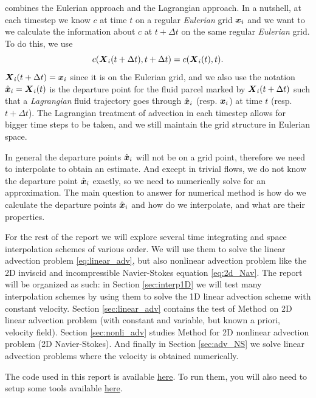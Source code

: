 \documentclass[11pt,letterpaper]{article}
\begin{document}
\sml\;combines the Eulerian approach and the Lagrangian approach. In a nutshell, at each timestep we know $c$ at time $t$ on a regular \textit{Eulerian} grid $\boldsymbol{x}_i$ and we want to we calculate the information about $c$ at $t+\Delta t$ on the same regular \textit{Eulerian} grid. To do this, we use
$$c(\boldsymbol{X}_i(t+\Delta t),t+\Delta t) = c({\boldsymbol{X}}_i(t),t).$$
$\boldsymbol{X}_i(t+\Delta t) = \boldsymbol{x}_i$ since it is on the Eulerian grid, and we also use the notation $\hat{\boldsymbol{x}}_i = {\boldsymbol{X}}_i(t)$ is the departure point for the fluid parcel marked by $\boldsymbol{X}_i(t+\Delta t)$ such that a \textit{Lagrangian} fluid trajectory goes through $\hat{\boldsymbol{x}}_i$ (resp. ${\boldsymbol{x}}_i$) at time $t$ (resp. $t+\Delta t$).
The Lagrangian treatment of advection in each timestep allows for bigger time steps to be taken, and we still maintain the grid structure in Eulerian space. 

In general the departure points $\hat{\boldsymbol{x}}_i$ will not be on a grid point, therefore we need to interpolate to obtain an estimate. And except in trivial flows, we do not know the departure point $\hat{\boldsymbol{x}}_i$ exactly, so we need to numerically solve for an approximation. The main question to answer for \sml\;numerical method is how do we calculate the departure points $\hat{\boldsymbol{x}}_i$ and how do we interpolate, and what are their properties. 

For the rest of the report we will explore several time integrating and space interpolation schemes of various order. We will use them to solve the linear advection problem \eqref{eq:linear_adv}, but also nonlinear advection problem like the 2D inviscid and incompressible Navier-Stokes equation \eqref{eq:2d_Nav}. The report will be organized as such: in Section \ref{sec:interp1D} we will test many interpolation schemes by using them to solve the 1D linear advection scheme with constant velocity. Section \ref{sec:linear_adv} contains the test of \sml\;Method on 2D linear advection problem (with constant and variable, but known a priori, velocity field). Section \ref{sec:nonli_adv} studies \sml\;Method for 2D nonlinear advection problem (2D Navier-Stokes). And finally in Section \ref{sec:adv_NS} we solve linear advection problems where the velocity is obtained numerically. 

The code used in this report is available \href{https://gitfront.io/r/ryansjdu/28f425abdfa7e44aff8ed6258556c272cf10d3ea/CompPDEs-FinalProj/}{here}. To run them, you will also need to setup some tools available \href{https://github.com/Empyreal092/MATLAB_Tool}{here}. 
\end{document}
